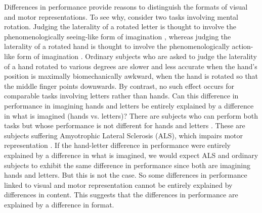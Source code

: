 \documentclass[12pt,\papersize]{extarticle}
\begin{document}
Differences in performance provide reasons to distinguish the formats of visual and motor representations. To see why, consider two tasks involving mental rotation. Judging the laterality of a rotated letter is thought to involve the phenomenologically seeing-like form of imagination \citep{jordan:2001_cortical}, whereas judging the laterality of a rotated hand is thought to involve the phenomenologically action-like form of imagination \citep{parsons:1987_imagined, gentilucci:1998_right}. Ordinary subjects who are asked to judge the laterality of a hand rotated to various degrees are slower and less accurate when the hand's position is maximally biomechanically awkward, when the hand is rotated so that the middle finger points downwards. By contrast, no such effect occurs for comparable tasks involving letters rather than hands. Can this difference in performance in imagining hands and letters be entirely explained by a difference in what is imagined (hands vs. letters)? There are subjects who can perform both tasks but whose performance is not different for hands and letters \citep{Fiori:2012fk}. These are subjects suffering Amyotrophic Lateral Sclerosis (ALS), which impairs motor representation \citep{parsons:1998_cerebrally}. If the hand-letter difference in performance were entirely explained by a difference in what is imagined, we would expect ALS and ordinary subjects to exhibit the same difference in performance since both are imagining hands and letters. But this is not the case. So some differences in performance linked to visual and motor representation cannot be entirely explained by differences in content.  This suggests that the differences in performance are explained by a difference in format.
\end{document}
